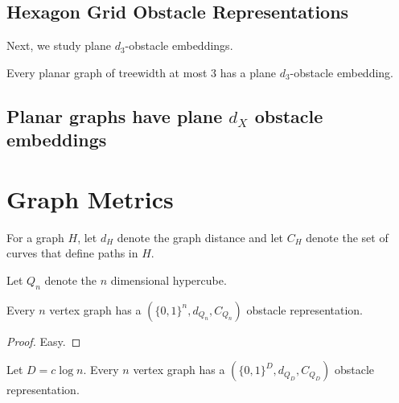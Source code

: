 \documentclass{patmorin}
\begin{document}
\subsection{Hexagon Grid Obstacle Representations}
 
Next, we study plane $d_3$-obstacle embeddings.

\begin{thm}
  Every planar graph of treewidth at most 3 has a plane $d_3$-obstacle embedding.   
\end{thm}

\subsection{Planar graphs have plane $d_{X}$ obstacle embeddings}

\section{Graph Metrics}

For a graph $H$, let $d_H$ denote the graph distance and let $C_H$ denote the set of curves that define paths in $H$.

Let $Q_n$ denote the $n$ dimensional hypercube.

\begin{thm}
  Every $n$ vertex graph has a $(\{0,1\}^n,d_{Q_n},C_{Q_n})$ obstacle
  representation.
\end{thm}

\begin{proof}
  Easy.
\end{proof}

\begin{thm}
  Let $D=c\log n$.
  Every $n$ vertex graph has a $(\{0,1\}^D,d_{Q_D},C_{Q_D})$ obstacle
  representation.
\end{thm}
\end{document}
